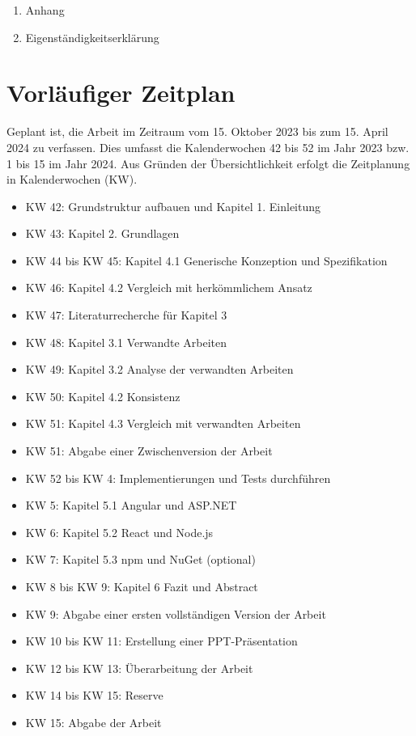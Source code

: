 \documentclass[12pt]{article} %
\begin{document}
\begin{enumerate}[label*=\Alph*]
\item Anhang
\item Eigenständigkeitserklärung 
\end{enumerate}


\section{Vorläufiger Zeitplan}

Geplant ist, die Arbeit im Zeitraum vom 15. Oktober 2023 bis zum 15. April 2024 zu verfassen. Dies umfasst die Kalenderwochen 42 bis 52 im Jahr 2023 bzw. 1 bis 15 im Jahr 2024. Aus Gründen der Übersichtlichkeit erfolgt die Zeitplanung in Kalenderwochen (KW).

\begin{itemize}
\item KW 42: Grundstruktur aufbauen und Kapitel 1. Einleitung
\item KW 43: Kapitel 2. Grundlagen
\item KW 44 bis KW 45: Kapitel 4.1 Generische Konzeption und Spezifikation
\item KW 46: Kapitel 4.2 Vergleich mit herkömmlichem Ansatz
\item KW 47: Literaturrecherche für Kapitel 3
\item KW 48: Kapitel 3.1 Verwandte Arbeiten
\item KW 49: Kapitel 3.2 Analyse der verwandten Arbeiten
\item KW 50: Kapitel 4.2 Konsistenz
\item KW 51: Kapitel 4.3 Vergleich mit verwandten Arbeiten
\item KW 51: Abgabe einer Zwischenversion der Arbeit
\item KW 52 bis KW 4: Implementierungen und Tests durchführen
\item KW 5: Kapitel 5.1 Angular und ASP.NET
\item KW 6: Kapitel 5.2 React und Node.js
\item KW 7: Kapitel 5.3 npm und NuGet (optional)
\item KW 8 bis KW 9: Kapitel 6 Fazit und Abstract
\item KW 9: Abgabe einer ersten vollständigen Version der Arbeit
\item KW 10 bis KW 11: Erstellung einer PPT-Präsentation
\item KW 12 bis KW 13: Überarbeitung der Arbeit
\item KW 14 bis KW 15: Reserve
\item KW 15: Abgabe der Arbeit
\end{itemize}

\printbibliography
\end{document}
